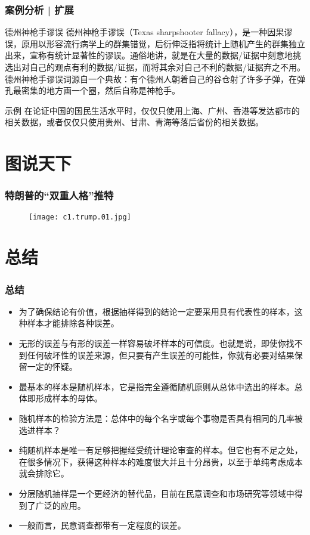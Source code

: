 \begin{frame}
  \frametitle{案例分析 | 扩展}
  \begin{block}{德州神枪手谬误}
    德州神枪手谬误（Texas sharpshooter fallacy），是一种因果谬误，原用以形容流行病学上的群集错觉，后衍伸泛指将统计上随机产生的群集独立出来，宣称有统计显著性的谬误。通俗地讲，就是在大量的数据/证据中刻意地挑选出对自己的观点有利的数据/证据，而将其余对自己不利的数据/证据弃之不用。\\
    德州神枪手谬误词源自一个典故：有个德州人朝着自己的谷仓射了许多子弹，在弹孔最密集的地方画一个圈，然后自称是神枪手。
  \end{block}
  \pause
  \begin{block}{示例}
    在论证中国的国民生活水平时，仅仅只使用上海、广州、香港等发达都市的相关数据，或者仅仅只使用贵州、甘肃、青海等落后省份的相关数据。
  \end{block}
\end{frame}

\section{图说天下}
\begin{frame}
  \frametitle{特朗普的“双重人格”推特}
  \begin{figure}
    \centering
    \texttt{[image: c1.trump.01.jpg]}
  \end{figure}
\end{frame}

\section{总结}
\begin{frame}
  \frametitle{总结}
  \begin{itemize}
    \item 为了确保结论有价值，根据抽样得到的结论一定要采用具有代表性的样本，这种样本才能排除各种误差。
    \item 无形的误差与有形的误差一样容易破坏样本的可信度。也就是说，即使你找不到任何破坏性的误差来源，但只要有产生误差的可能性，你就有必要对结果保留一定的怀疑。
    \item 最基本的样本是随机样本，它是指完全遵循随机原则从总体中选出的样本。总体即形成样本的母体。 
    \item 随机样本的检验方法是：总体中的每个名字或每个事物是否具有相同的几率被选进样本？
    \item 纯随机样本是唯一有足够把握经受统计理论审查的样本。但它也有不足之处，在很多情况下，获得这种样本的难度很大并且十分昂贵，以至于单纯考虑成本就会排除它。
    \item 分层随机抽样是一个更经济的替代品，目前在民意调查和市场研究等领域中得到了广泛的应用。
    \item 一般而言，民意调查都带有一定程度的误差。
  \end{itemize}
\end{frame}



